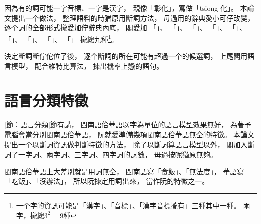 因為有的詞可能一字音標、一字是漢字，
親像「彰化」，寫做「tsiong-化」。
本論文提出一个做法，
整理語料的時猶原用斷詞方法，
毋過用的辭典愛小可仔改變，
逐个詞的全部形式攏愛加佇辭典內底，
閣愛加
「」、
「」、
「」、
「」、
「」、
「」、
「」、
「」、
「」
攏總九種\footnote{一个字的資訊可能是「漢字」、「音標」、「漢字音標攏有」三種其中一種。
兩字，攏總$3^{2}=9$種}。


決定斷詞斷佇佗位了後，
逐个斷詞的所在可能有超過一个的候選詞，
上尾閣用語言模型，
配合維特比算法，
揀出機率上懸的語句。


\section{語言分類特徵}
\label{節：語言分類特徵}

\ref{節：語言分類}節有講，
閩南語佮華語以字為單位的語言模型效果無好，
為著予電腦會當分別閩南語佮華語，
阮就愛準備幾項閩南語佮華語無仝的特徵。
本論文提出一个以斷詞資訊做判斷特徵的方法，
除了以斷詞算語言模型以外，
閣加入斷詞了一字詞、兩字詞、三字詞、四字詞的詞數，
毋過按呢猶原無夠。

閩南語佮華語上大差別就是用詞無仝，
閩南語寫「食飯」、「無法度」，
華語寫「吃飯」、「沒辦法」，
所以阮揀定用詞出來，
當作阮的特徵之一。

